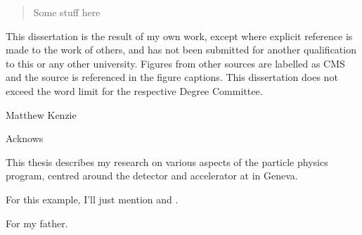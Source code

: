 
\begin{abstract}%
  Some stuff here
\end{abstract}


\begin{declaration}
  This dissertation is the result of my own work, except where explicit
  reference is made to the work of others, and has not been submitted
  for another qualification to this or any other university. Figures from other
  sources are labelled as CMS and the source is referenced in the figure captions.
  This dissertation does not exceed the word limit for the respective Degree
  Committee.
  \vspace*{1cm}
  \begin{flushright}
    Matthew Kenzie
  \end{flushright}
\end{declaration}


\begin{acknowledgements}
  Acknows
\end{acknowledgements}


\begin{preface}
  This thesis describes my research on various aspects of the \LHCb
  particle physics program, centred around the \LHCb detector and \LHC
  accelerator at \CERN in Geneva.

  \noindent
  For this example, I'll just mention 
  and .
\end{preface}

\tableofcontents

\frontquote%
  {For my father.}%
  {}
